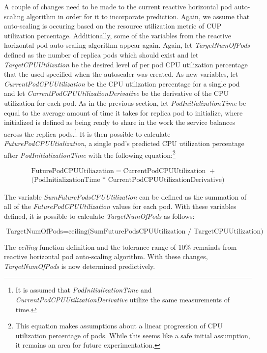 A couple of changes need to be made to the current reactive horizontal pod
auto-scaling algorithm in order for it to incorporate prediction. Again, we
assume that auto-scaling is occuring based on the resource utilization metric of
CUP utilization percentage. Additionally, some of the variables from the
reactive horizontal pod auto-scaling algorithm appear again. Again, let
\textit{TargetNumOfPods} defined as the number of replica pods which should
exist and let \textit{TargetCPUUtilization} be the desired level of per pod CPU
utilization percentage that the used specified when the autoscaler was created.
As new variables, let \textit{CurrentPodCPUUtilization} be the CPU utilization
percentage for a single pod and let \textit{CurrentPodCPUUtilizationDerivative}
be the derivative of the CPU utilization for each pod. As in the previous section,
let \textit{PodInitializationTime} be equal
to the average amount of time it takes for replica pod to initialize,
where initialized is defined as being ready to share in the work the
service balances across the replica pods.\footnote{It is assumed that
\textit{PodInitializationTime} and \textit{CurrentPodCPUUtilizationDerivative}
utilize the same measurements of time.} It is then possible to calculate
\textit{FuturePodCPUUtialization}, a single pod's predicted CPU utilization
percentage after \textit{PodInitializationTime} with the following
equation:\footnote{This equation makes assumptions about a linear progression of
CPU utilization percentage of pods. While this seems like a safe initial
assumption, it remains an area for future experimentation.}

\begin{align*}
  \mbox{FuturePodCPUUtiliazation} = \mbox{CurrentPodCPUUtilization } + \\
  \mbox{(PodInitializationTime * CurrentPodCPUUtilizationDerivative)}
\end{align*}

The variable \textit{SumFuturePodsCPUUtilization} can be defined as the
summation of all of the \textit{FuturePodCPUUtilization} values for each pod.
With these variables defined, it is possible to calculate
\textit{TargetNumOfPods} as follows:

\[ \mbox{TargetNumOfPods} = \mbox{ceiling(SumFuturePodsCPUUtilization /
TargetCPUUtilization)} \]

The \textit{ceiling} function definition and the tolerance range of 10\% remainds from
reactive horizontal pod auto-scaling algorithm. With these changes,
\textit{TargetNumOfPods} is now determined predictively.
